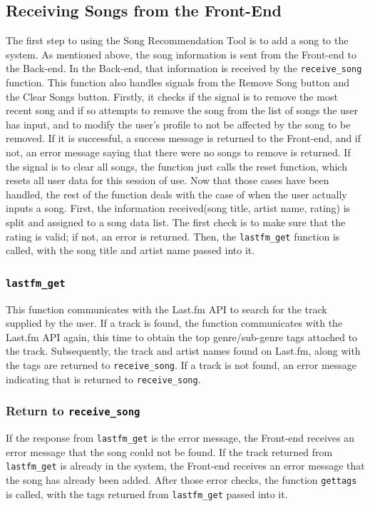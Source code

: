 \documentclass{l4proj}
\begin{document}
\subsection{Receiving Songs from the Front-End}
The first step to using the Song Recommendation Tool is to add a song to the system. As mentioned above, the song information is sent from the Front-end to the Back-end. In the Back-end, that information is received by the \texttt{receive\_song} function. This function also handles signals from the Remove Song button and the Clear Songs button. Firstly, it checks if the signal is to remove the most recent song and if so attempts to remove the song from the list of songs the user has input, and to modify the user's profile to not be affected by the song to be removed. If it is successful, a success message is returned to the Front-end, and if not, an error message saying that there were no songs to remove is returned. If the signal is to clear all songs, the function just calls the reset function, which resets all user data for this session of use. Now that those cases have been handled, the rest of the function deals with the case of when the user actually inputs a song. First, the information received(song title, artist name, rating) is split and assigned to a song data list. The first check is to make sure that the rating is valid; if not, an error is returned. Then, the \texttt{lastfm\_get} function is called, with the song title and artist name passed into it.
\subsubsection{\texttt{lastfm\_get}}
This function communicates with the Last.fm API to search for the track supplied by the user. If a track is found, the function communicates with the Last.fm API again, this time to obtain the top genre/sub-genre tags attached to the track. Subsequently, the track and artist names found on Last.fm, along with the tags are returned to \texttt{receive\_song}. If a track is not found, an error message indicating that is returned to \texttt{receive\_song}.
\subsubsection{Return to \texttt{receive\_song}}
If the response from \texttt{lastfm\_get} is the error message, the Front-end receives an error message that the song could not be found. If the track returned from \texttt{lastfm\_get} is already in the system, the Front-end receives an error message that the song has already been added. After those error checks, the function \texttt{gettags} is called, with the tags returned from \texttt{lastfm\_get} passed into it.
\end{document}
